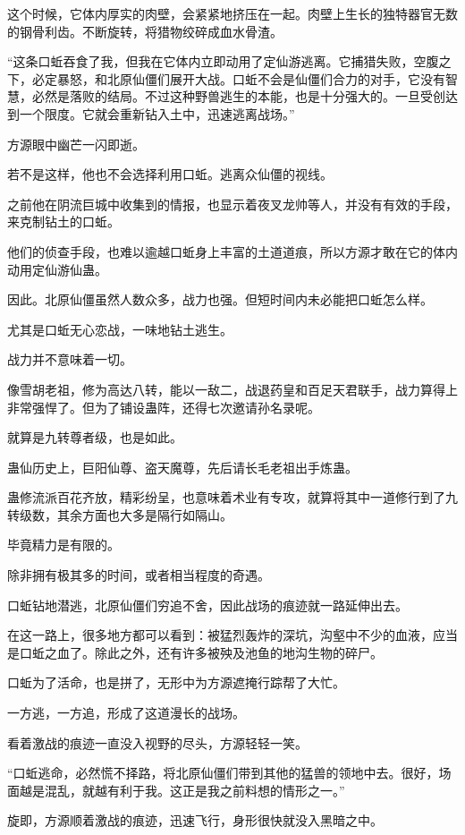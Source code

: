 \begin{this_body}
这个时候，它体内厚实的肉壁，会紧紧地挤压在一起。肉壁上生长的独特器官无数的钢骨利齿。不断旋转，将猎物绞碎成血水骨渣。

“这条口蚯吞食了我，但我在它体内立即动用了定仙游逃离。它捕猎失败，空腹之下，必定暴怒，和北原仙僵们展开大战。口蚯不会是仙僵们合力的对手，它没有智慧，必然是落败的结局。不过这种野兽逃生的本能，也是十分强大的。一旦受创达到一个限度。它就会重新钻入土中，迅速逃离战场。”

方源眼中幽芒一闪即逝。

若不是这样，他也不会选择利用口蚯。逃离众仙僵的视线。

之前他在阴流巨城中收集到的情报，也显示着夜叉龙帅等人，并没有有效的手段，来克制钻土的口蚯。

他们的侦查手段，也难以逾越口蚯身上丰富的土道道痕，所以方源才敢在它的体内动用定仙游仙蛊。

因此。北原仙僵虽然人数众多，战力也强。但短时间内未必能把口蚯怎么样。

尤其是口蚯无心恋战，一味地钻土逃生。

战力并不意味着一切。

像雪胡老祖，修为高达八转，能以一敌二，战退药皇和百足天君联手，战力算得上非常强悍了。但为了铺设蛊阵，还得七次邀请孙名录呢。

就算是九转尊者级，也是如此。

蛊仙历史上，巨阳仙尊、盗天魔尊，先后请长毛老祖出手炼蛊。

蛊修流派百花齐放，精彩纷呈，也意味着术业有专攻，就算将其中一道修行到了九转级数，其余方面也大多是隔行如隔山。

毕竟精力是有限的。

除非拥有极其多的时间，或者相当程度的奇遇。

口蚯钻地潜逃，北原仙僵们穷追不舍，因此战场的痕迹就一路延伸出去。

在这一路上，很多地方都可以看到：被猛烈轰炸的深坑，沟壑中不少的血液，应当是口蚯之血了。除此之外，还有许多被殃及池鱼的地沟生物的碎尸。

口蚯为了活命，也是拼了，无形中为方源遮掩行踪帮了大忙。

一方逃，一方追，形成了这道漫长的战场。

看着激战的痕迹一直没入视野的尽头，方源轻轻一笑。

“口蚯逃命，必然慌不择路，将北原仙僵们带到其他的猛兽的领地中去。很好，场面越是混乱，就越有利于我。这正是我之前料想的情形之一。”

旋即，方源顺着激战的痕迹，迅速飞行，身形很快就没入黑暗之中。


\end{this_body}

